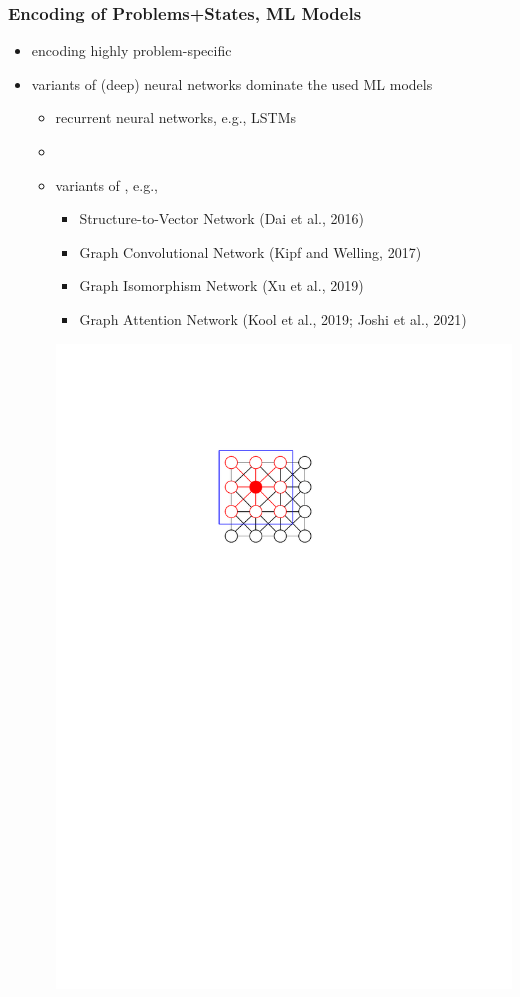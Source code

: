 \documentclass[aspectratio=1610]{beamer}
\newcommand{\important}[1]{{\color{green!60!black}#1}}
\begin{document}
\begin{frame}
	\frametitle{Encoding of Problems+States, ML Models}

	\begin{itemize}
		\itemsep3ex
		\item encoding highly problem-specific
		\item variants of (deep) neural networks dominate the used ML models
		\begin{itemize}
			\itemsep1.3ex
			\item recurrent neural networks, e.g., LSTMs
			\item {} \citep{vinyals-2015}
			\item variants of  \citep{scarselli2008graph}, e.g.,
			\begin{itemize}
				\item Structure-to-Vector Network (Dai et al., 2016)
				\item Graph Convolutional Network (Kipf and Welling, 2017)
				\item Graph Isomorphism Network (Xu et al., 2019)
				\item Graph Attention Network (Kool et al., 2019; Joshi et al., 2021)
			\end{itemize}
			{\includegraphics[width=0.7\linewidth, page=3]{figures/graphics.pdf}}\\[2ex]
		\end{itemize} 
	\end{itemize}
\end{frame}
\end{document}
